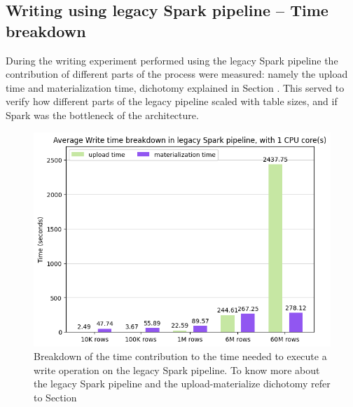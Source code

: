 \subsection{Writing using legacy Spark pipeline -- Time breakdown}

During the writing experiment performed using the legacy Spark pipeline the contribution of different parts of the process were measured: namely the upload time and materialization time, dichotomy explained in Section . This served to verify how different parts of the legacy pipeline scaled with table sizes, and if Spark was the bottleneck of the architecture.

\begin{figure}[!ht]
    \centering
    \includegraphics[width=\textwidth]{figures/5-results/diagram_hudi_virtualiz_1_core.png}
    \caption{Breakdown of the time contribution to the time needed to execute a write operation on the legacy Spark pipeline. To know more about the legacy Spark pipeline and the upload-materialize dichotomy refer to Section }
    \label{fig:hudi_virtualiz_breakdown}
\end{figure}